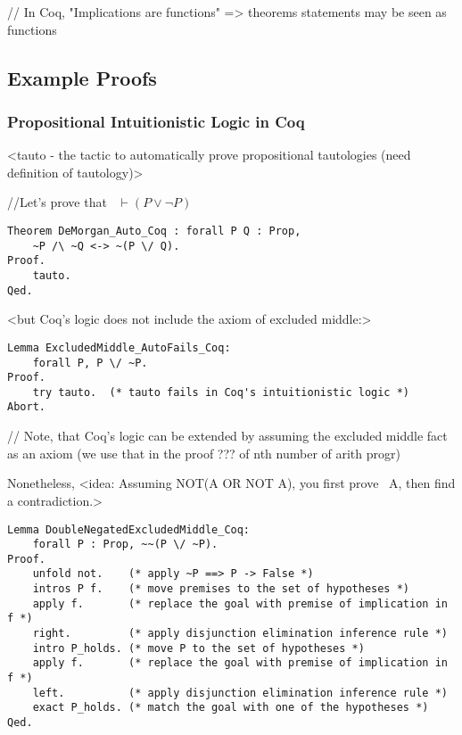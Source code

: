 \documentclass[article]{aaltoseries}
\begin{document}
// In Coq, "Implications are functions" => theorems statements may be seen as functions %


\subsection{Example Proofs}

\subsubsection{Propositional Intuitionistic Logic in Coq}

<tauto - the tactic to automatically prove propositional tautologies (need definition of tautology)>

//Let's prove that ~$\vdash (P \lor \neg P) $

\begin{lstlisting}[language=coq]
Theorem DeMorgan_Auto_Coq : forall P Q : Prop, 
    ~P /\ ~Q <-> ~(P \/ Q).
Proof.
    tauto.
Qed.
\end{lstlisting}


<but Coq's logic does not include the axiom of excluded middle:>
\begin{lstlisting}[language=coq]
Lemma ExcludedMiddle_AutoFails_Coq:
    forall P, P \/ ~P.
Proof.
    try tauto.  (* tauto fails in Coq's intuitionistic logic *)
Abort.
\end{lstlisting}

// Note, that Coq's logic can be extended by assuming the excluded middle fact as an axiom (we use that in the proof ??? of nth number of arith progr)

Nonetheless, <idea: Assuming NOT(A OR NOT A), you first prove ~A, then find a contradiction.>

\begin{lstlisting}[language=coq]
Lemma DoubleNegatedExcludedMiddle_Coq:
    forall P : Prop, ~~(P \/ ~P).
Proof.
    unfold not.    (* apply ~P ==> P -> False *)
    intros P f.    (* move premises to the set of hypotheses *)
    apply f.       (* replace the goal with premise of implication in f *)
    right.         (* apply disjunction elimination inference rule *)
    intro P_holds. (* move P to the set of hypotheses *)
    apply f.       (* replace the goal with premise of implication in f *)
    left.          (* apply disjunction elimination inference rule *)
    exact P_holds. (* match the goal with one of the hypotheses *)
Qed.
\end{lstlisting}
\end{document}
